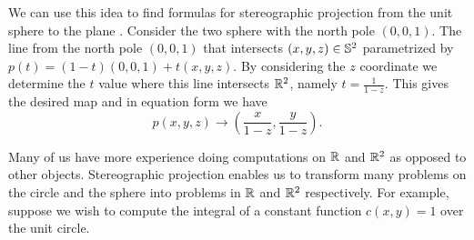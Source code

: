 We can use this idea to find formulas for stereographic projection from
the unit sphere to the plane \cite{christian-notes}.
Consider the two sphere with the north pole $(0,0,1)$.
The line from the north pole $(0,0,1)$ that intersects $(x,y,z)\in \mathbb{S}^2$ parametrized by 
$p(t)=(1-t)(0,0,1)+t(x,y,z)$. By considering the $z$ coordinate we determine the $t$ value where this line
intersects $\mathbb{R}^2$, namely $t=\frac{1}{1-z}.$
This gives the desired map  and in equation form we have
$$p(x,y,z)\to \left(\frac{x}{1-z},\frac{y}{1-z}\right).$$

Many of us have more experience doing computations on $\mathbb{R}$ and $\mathbb{R}^2$ as opposed
to other objects. Stereographic projection enables us to transform many problems on
the circle and the sphere into problems in $\mathbb{R}$ and $\mathbb{R}^2$ respectively.
For example, suppose we wish to compute the integral of a constant function
$c(x,y)=1$ over the unit circle. 

	
